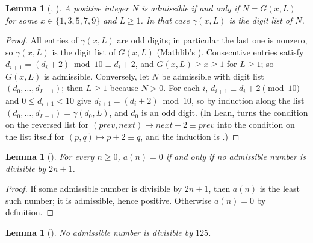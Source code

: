 \documentclass[11pt]{amsart}
\theoremstyle{plain}
\newtheorem{lemma}[theorem]{Lemma}
\theoremstyle{definition}
\begin{document}
\begin{lemma}[, ]\label{lem:gen}
A positive integer $N$ is admissible if and only if $N=G(x,L)$ for some $x\in\{1,3,5,7,9\}$ and $L\ge1$. In that case $\gamma(x,L)$ is the digit list of $N$.
\end{lemma}

\begin{proof}
All entries of $\gamma(x,L)$ are odd digits; in particular the last one is nonzero, so $\gamma(x,L)$ is the digit list of $G(x,L)$ (Mathlib's ). Consecutive entries satisfy $d_{i+1}=(d_i+2)\bmod 10\equiv d_i+2$, and $G(x,L)\ge x\ge1$ for $L\ge1$; so $G(x,L)$ is admissible.
Conversely, let $N$ be admissible with digit list $(d_0,\dots,d_{L-1})$; then $L\ge1$ because $N>0$. For each $i$, $d_{i+1}\equiv d_i+2\pmod{10}$ and $0\le d_{i+1}<10$ give $d_{i+1}=(d_i+2)\bmod 10$, so by induction along the list $(d_0,\dots,d_{L-1})=\gamma(d_0,L)$, and $d_0$ is an odd digit. (In Lean,  turns the condition on the reversed list for $(\mathit{prev},\mathit{next})\mapsto \mathit{next}+2\equiv \mathit{prev}$ into the condition on the list itself for $(p,q)\mapsto p+2\equiv q$, and the induction is .)
\end{proof}

\begin{lemma}[]\label{lem:zero}
For every $n\ge0$, $a(n)=0$ if and only if no admissible number is divisible by $2n+1$.
\end{lemma}

\begin{proof}
If some admissible number is divisible by $2n+1$, then $a(n)$ is the least such number; it is admissible, hence positive. Otherwise $a(n)=0$ by definition.
\end{proof}

\begin{lemma}[]\label{lem:125}
No admissible number is divisible by $125$.
\end{lemma}
\end{document}
